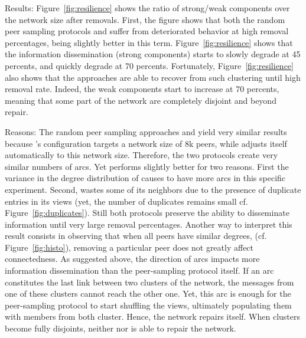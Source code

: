 \begin{asparadesc}
\item[Results:] Figure~\ref{fig:resilience} shows the ratio of strong/weak
  components over the network size after removals. First, the figure shows that
  both the random peer sampling protocols \SPRAY and \CYCLON suffer from
  deteriorated behavior at high removal percentages, \CYCLON being slightly
  better in this term. Figure~\ref{fig:resilience} shows that the information
  dissemination (strong components) starts to slowly degrade at 45 percents, and
  quickly degrade at 70 percents. Fortunately, Figure~\ref{fig:resilience} also
  shows that the approaches are able to recover from such clustering until high
  removal rate. Indeed, the weak components start to increase at 70 percents,
  meaning that some part of the network are completely disjoint and beyond
  repair.%
\item[Reasons:] The random peer sampling approaches \CYCLON and \SPRAY
  yield very similar results because \CYCLON's configuration targets a
  network size of 8k peers, while \SPRAY adjusts itself automatically
  to this network size.  Therefore, the two protocols create very
  similar numbers of arcs. Yet \CYCLON performs slightly better for
  two reasons. First the variance in the degree distribution of \SPRAY
  causes \CYCLON to have more arcs in this specific
  experiment. Second, \SPRAY wastes some of its neighbors due to the
  presence of duplicate entries in its views (yet, the number of
  duplicates remains small cf. Figure~\ref{fig:duplicates}). Still
  both protocols preserve the ability to disseminate information until
  very large removal percentages. Another way to interpret this result
  consists in observing that when all peers have similar degrees,
  (cf. Figure~\ref{fig:histo}), removing a particular peer does not
  greatly affect connectedness. As suggested above, the direction of
  arcs impacts more information dissemination than the peer-sampling
  protocol itself. If an arc constitutes the last link between two
  clusters of the network, the messages from one of these clusters
  cannot reach the other one. Yet, this arc is enough for the
  peer-sampling protocol to start shuffling the views, ultimately
  populating them with members from both cluster. Hence, the network
  repairs itself.  When clusters become fully disjoints, neither
  \CYCLON nor \SPRAY is able to repair the
  network.  %
\end{asparadesc}


